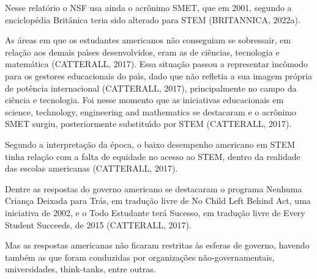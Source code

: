 \documentclass[
12pt,		%
openright,	%
twoside,  %
a4paper,			%
chapter=TITLE,		%
english,			%
french,				%
spanish,			%
brazil				%
]{USPSC-classe/USPSC}
\begin{document}
Nesse relat\'orio o NSF usa ainda o acr\^onimo SMET, que em 2001, segundo a enciclop\'edia Brit\^anica teria sido alterado para STEM  (BRITANNICA, 2022a).










As \'areas em que os estudantes americanos n\~ao conseguiam se sobressair, em rela\c{c}\~ao aos demais pa\'{\i}ses desenvolvidos, eram as de ci\^encias, tecnologia e matem\'atica  (CATTERALL, 2017). Essa situa\c{c}\~ao passou a representar inc\^omodo para os gestores educacionais do pa\'{\i}s, dado que n\~ao refletia a sua imagem pr\'opria de pot\^encia internacional  (CATTERALL, 2017), principalmente no campo da ci\^encia e tecnologia. Foi nesse momento que as iniciativas educacionais em \textquotedbl science, technology, engineering and mathematics se destacaram e o acr\^onimo SMET surgiu, posteriormente substitu\'{\i}do por STEM  (CATTERALL, 2017).










Segundo a interpreta\c{c}\~ao da \'epoca, o baixo desempenho americano em STEM tinha rela\c{c}\~ao com a falta de equidade no acesso ao STEM, dentro da realidade das escolas americanas  (CATTERALL, 2017).










Dentre as respostas do governo americano se destacaram o programa \textquotedbl Nenhuma Crian\c{c}a Deixada para Tr\'as, em tradu\c{c}\~ao livre de \textquotedbl No Child Left Behind Act, uma iniciativa de 2002, e o \textquotedbl Todo Estudante ter\'a Sucesso, em tradu\c{c}\~ao livre de \textquotedbl Every Student Succeeds, de 2015  (CATTERALL, 2017).










Mas as respostas americanas n\~ao ficaram restritas \`as esferas de governo, havendo tamb\'em as que foram conduzidas por organiza\c{c}\~oes n\~ao-governamentais, universidades, think-tanks, entre outras.
\end{document}
